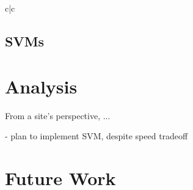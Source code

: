 \documentclass[preprint]{acm_proc_article-sp}
\begin{document}
\begin{tabular}{c|c

%
%

\subsection{SVMs}

%
%

\section{Analysis}
From a site's perspective, ...

- plan to implement SVM, despite speed tradeoff 

\section{Future Work}

}
\end{tabular}
\end{document}

